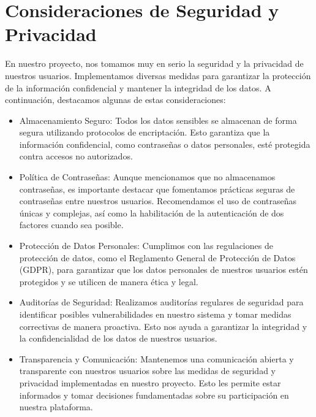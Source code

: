 \documentclass{article}
\begin{document}
\section{Consideraciones de Seguridad y Privacidad}

    En nuestro proyecto, nos tomamos muy en serio la seguridad y la privacidad de nuestros usuarios. Implementamos diversas medidas para garantizar la protección de la información confidencial y mantener la integridad de los datos. A continuación, destacamos algunas de estas consideraciones:
    
    \begin{itemize}
        \item Almacenamiento Seguro: Todos los datos sensibles se almacenan de forma segura utilizando protocolos de encriptación. Esto garantiza que la información confidencial, como contraseñas o datos personales, esté protegida contra accesos no autorizados.
    
        \item Política de Contraseñas: Aunque mencionamos que no almacenamos contraseñas, es importante destacar que fomentamos prácticas seguras de contraseñas entre nuestros usuarios. Recomendamos el uso de contraseñas únicas y complejas, así como la habilitación de la autenticación de dos factores cuando sea posible.
    
        \item Protección de Datos Personales: Cumplimos con las regulaciones de protección de datos, como el Reglamento General de Protección de Datos (GDPR), para garantizar que los datos personales de nuestros usuarios estén protegidos y se utilicen de manera ética y legal.
    
        \item Auditorías de Seguridad: Realizamos auditorías regulares de seguridad para identificar posibles vulnerabilidades en nuestro sistema y tomar medidas correctivas de manera proactiva. Esto nos ayuda a garantizar la integridad y la confidencialidad de los datos de nuestros usuarios.
    
        \item Transparencia y Comunicación: Mantenemos una comunicación abierta y transparente con nuestros usuarios sobre las medidas de seguridad y privacidad implementadas en nuestro proyecto. Esto les permite estar informados y tomar decisiones fundamentadas sobre su participación en nuestra plataforma.
        
    \end{itemize}
    
\end{document}
